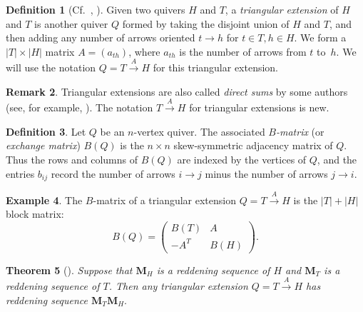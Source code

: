 \documentclass[11pt, letterpaper]{amsart}
\newtheorem{theorem}{Theorem}[section]
\theoremstyle{definition}
\newtheorem{remark}[theorem]{Remark}
\newtheorem{example}[theorem]{Example}
\newtheorem{definition}[theorem]{Definition}
\numberwithin{equation}{section}
\begin{document}
\begin{definition}[{Cf.\ \cite[Definition 3.7]{MR2640929}, \cite[Theorem 4.4]{MR4186974}}]
\label{def:tri extension}
Given two quivers $H$ and $T$, a \emph{triangular extension} of $H$ and $T$ is another quiver $Q$ formed by taking the disjoint union of $H$ and $T$, and then adding any number of arrows oriented $t \rightarrow h$ for $t \in T,h \in H$.
We form a $|T| \times |H|$ matrix $A = (a_{th})$, where $a_{th}$ is the number of arrows from $t$ to~$h.$ 
We will use the notation $Q = T \stackrel{A}{\rightarrow} H$ for this triangular extension. %
\end{definition}

\begin{remark}
Triangular extensions are also called \emph{direct sums} by some authors (see, for example, \cite{MR4183151, MR3767505, MR3604067}).
The notation $T \stackrel{A}{\rightarrow} H$ for triangular extensions is new.
\end{remark}

\begin{definition}
\label{def:b-matrix}
Let $Q$ be an $n$-vertex quiver.
The associated \emph{$B$-matrix} (or \emph{exchange matrix}) $B(Q)$ is the $n\times n$ skew-symmetric adjacency matrix of $Q$.
Thus the rows and columns of $B(Q)$ are indexed by the vertices of $Q$, and the entries $b_{ij}$ record the number of arrows $i\rightarrow j$ minus the number of arrows $j \rightarrow i$. %
\end{definition}

\begin{example}
The $B$-matrix of a triangular extension $Q = T \stackrel{A}{\rightarrow} H$ is the $|T| + |H|$ block matrix:
$$B(Q) = \begin{pmatrix} B(T) & A \\ -A^T & B(H) \end{pmatrix}.$$
\end{example}


\begin{theorem}[{\cite[Theorem 4.5, Remark 4.6]{MR4029226}}] %
\label{thm:extension red seq}
Suppose that $\mathbf{M}_H$ is a reddening sequence of $H$ and $\mathbf{M}_T$ is a reddening sequence of $T$.
Then any triangular extension $Q = T \stackrel{A}{\rightarrow} H$ has reddening sequence $\mathbf{M}_T\mathbf{M}_H.$
\end{theorem}
\end{document}
